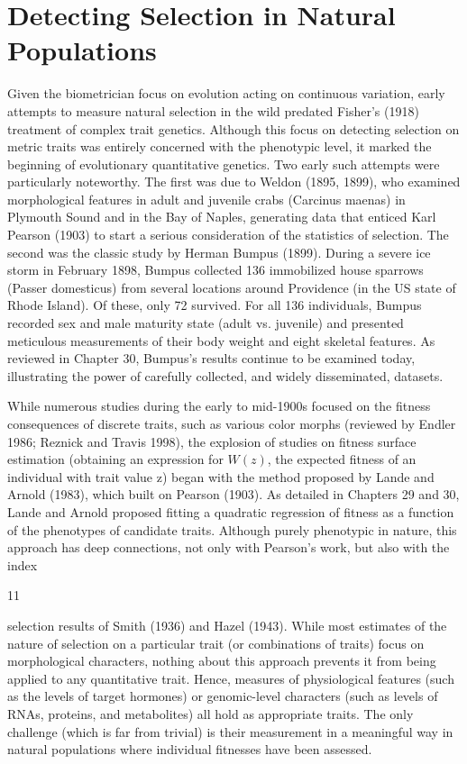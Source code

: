 \documentclass{article}
\begin{document}
\section{Detecting Selection in Natural Populations}
Given the biometrician focus on evolution acting on continuous variation, early attempts to measure natural selection in the wild predated Fisher's (1918) treatment of complex trait genetics. Although this focus on detecting selection on metric traits was entirely concerned with the phenotypic level, it marked the beginning of evolutionary quantitative genetics. Two early such attempts were particularly noteworthy. The first was due to Weldon (1895, 1899), who examined morphological features in adult and juvenile crabs (Carcinus maenas) in Plymouth Sound and in the Bay of Naples, generating data that enticed Karl Pearson (1903) to start a serious consideration of the statistics of selection. The second was the classic study by Herman Bumpus (1899). During a severe ice storm in February 1898, Bumpus collected 136 immobilized house sparrows (Passer domesticus) from several locations around Providence (in the US state of Rhode Island). Of these, only 72 survived. For all 136 individuals, Bumpus recorded sex and male maturity state (adult vs. juvenile) and presented meticulous measurements of their body weight and eight skeletal features. As reviewed in Chapter 30, Bumpus's results continue to be examined today, illustrating the power of carefully collected, and widely disseminated, datasets.

While numerous studies during the early to mid-1900s focused on the fitness consequences of discrete traits, such as various color morphs (reviewed by Endler 1986; Reznick and Travis 1998), the explosion of studies on fitness surface estimation (obtaining an expression for  $ W(z) $, the expected fitness of an individual with trait value z) began with the method proposed by Lande and Arnold (1983), which built on Pearson (1903). As detailed in Chapters 29 and 30, Lande and Arnold proposed fitting a quadratic regression of fitness as a function of the phenotypes of candidate traits. Although purely phenotypic in nature, this approach has deep connections, not only with Pearson's work, but also with the index

11

selection results of Smith (1936) and Hazel (1943). While most estimates of the nature of selection on a particular trait (or combinations of traits) focus on morphological characters, nothing about this approach prevents it from being applied to any quantitative trait. Hence, measures of physiological features (such as the levels of target hormones) or genomic-level characters (such as levels of RNAs, proteins, and metabolites) all hold as appropriate traits. The only challenge (which is far from trivial) is their measurement in a meaningful way in natural populations where individual fitnesses have been assessed.
\end{document}
